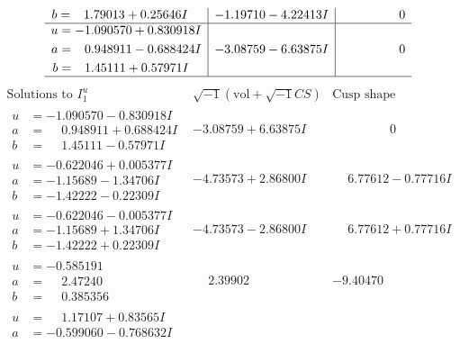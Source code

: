 \documentclass[1p]{elsarticle_modified}
\theoremstyle{definition}
\newcommand{\I}{\sqrt{-1}}
\begin{document}
$$\begin{array}{c|c|c}
\begin{aligned}
b &= \phantom{-}1.79013 + 0.25646 I\end{aligned}
 & -1.19710 - 4.22413 I & \phantom{-0.000000 } 0 \\ \hline\begin{aligned}
u &= -1.090570 + 0.830918 I \\
a &= \phantom{-}0.948911 - 0.688424 I \\
b &= \phantom{-}1.45111 + 0.57971 I\end{aligned}
 & -3.08759 - 6.63875 I & \phantom{-0.000000 } 0\\
 \hline 
 \end{array}$$\newpage$$\begin{array}{c|c|c}  
\text{Solutions to }I^u_{1}& \I (\text{vol} + \sqrt{-1}CS) & \text{Cusp shape}\\
 \hline 
\begin{aligned}
u &= -1.090570 - 0.830918 I \\
a &= \phantom{-}0.948911 + 0.688424 I \\
b &= \phantom{-}1.45111 - 0.57971 I\end{aligned}
 & -3.08759 + 6.63875 I & \phantom{-0.000000 } 0 \\ \hline\begin{aligned}
u &= -0.622046 + 0.005377 I \\
a &= -1.15689 - 1.34706 I \\
b &= -1.42222 - 0.22309 I\end{aligned}
 & -4.73573 + 2.86800 I & \phantom{-}6.77612 - 0.77716 I \\ \hline\begin{aligned}
u &= -0.622046 - 0.005377 I \\
a &= -1.15689 + 1.34706 I \\
b &= -1.42222 + 0.22309 I\end{aligned}
 & -4.73573 - 2.86800 I & \phantom{-}6.77612 + 0.77716 I \\ \hline\begin{aligned}
u &= -0.585191\phantom{ +0.000000I} \\
a &= \phantom{-}2.47240\phantom{ +0.000000I} \\
b &= \phantom{-}0.385356\phantom{ +0.000000I}\end{aligned}
 & \phantom{-}2.39902\phantom{ +0.000000I} & -9.40470\phantom{ +0.000000I} \\ \hline\begin{aligned}
u &= \phantom{-}1.17107 + 0.83565 I \\
a &= -0.599060 - 0.768632 I \\

\end{aligned}
\end{array}$$
\end{document}
